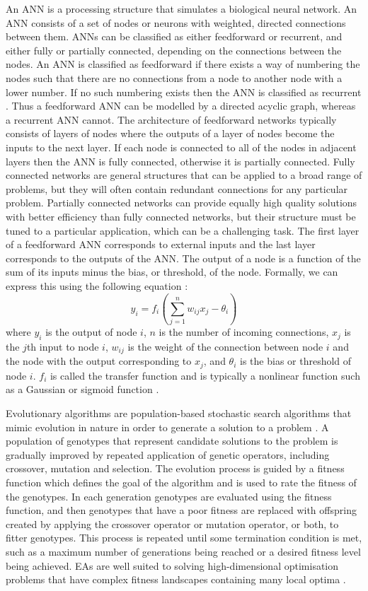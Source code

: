 \documentclass[12pt]{article} %
\begin{document}
An ANN is a processing structure that simulates a biological neural network. An ANN consists of a set of nodes or neurons with weighted, directed connections between them. ANNs can be classified as either feedforward or recurrent, and either fully or partially connected, depending on the connections between the nodes. An ANN is classified as feedforward if there exists a way of numbering the nodes such that there are no connections from a node to another node with a lower number. If no such numbering exists then the ANN is classified as recurrent \cite{Yao1999}. Thus a feedforward ANN can be modelled by a directed acyclic graph, whereas a recurrent ANN cannot.
The architecture of feedforward networks typically consists of layers of nodes where the outputs of a layer of nodes become the inputs to the next layer. If each node is connected to all of the nodes in adjacent layers then the ANN is fully connected, otherwise it is partially connected. Fully connected networks are general structures that can be applied to a broad range of problems, but they will often contain redundant connections for any particular problem. Partially connected networks can provide equally high quality solutions with better efficiency than fully connected networks, but their structure must be tuned to a particular application, which can be a challenging task. The first layer of a feedforward ANN corresponds to external inputs and the last layer corresponds to the outputs of the ANN. The output of a node is a function of the sum of its inputs minus the bias, or threshold, of the node. Formally, we can express this using the following equation \cite{Yao1999}:
\[
y_i = f_i \left(\sum_{j = 1} ^n w_{ij}x_j - \theta_i \right)
\]
where $y_i$ is the output of node $i$, $n$ is the number of incoming connections, $x_j$ is the $j$th input to node $i$, $w_{ij}$ is the weight of the connection between node $i$ and the node with the output corresponding to $x_j$, and $\theta_i$ is the bias or threshold of node $i$. $f_i$ is called the transfer function and is typically a nonlinear function such as a Gaussian or sigmoid function \cite{Yao1999}.

Evolutionary algorithms are population-based stochastic search algorithms that mimic evolution in nature in order to generate a solution to a problem \cite{Floreano2008}\cite{Yao1999}. A population of genotypes that represent candidate solutions to the problem is gradually improved by repeated application of genetic operators, including crossover, mutation and selection. The evolution process is guided by a fitness function which defines the goal of the algorithm and is used to rate the fitness of the genotypes. In each generation genotypes are evaluated using the fitness function, and then genotypes that have a poor fitness are replaced with offspring created by applying the crossover operator or mutation operator, or both, to fitter genotypes. This process is repeated until some termination condition is met, such as a maximum number of generations being reached or a desired fitness level being achieved. EAs are well suited to solving high-dimensional optimisation problems that have complex fitness landscapes containing many local optima \cite{Yao1999}.
\end{document}
